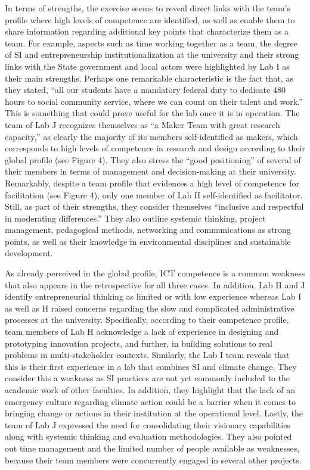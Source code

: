 \documentclass[AMA,STIX1COL,APA,STIX2COL]{WileyNJD-v2}
\begin{document}
In terms of strengths, the exercise seems to reveal direct links with
the team's profile where high levels of competence are identified, as
well as enable them to share information regarding additional key points
that characterize them as a team. For example, aspects such as time
working together as a team, the degree of SI and entrepreneurship
institutionalization at the university and their strong links with the
State government and local actors were highlighted by Lab I as their
main strengths. Perhaps one remarkable characteristic is the fact that,
as they stated, ``all our students have a mandatory federal duty to
dedicate 480 hours to social community service, where we can count on
their talent and work.'' This is something that could prove useful for
the lab once it is in operation. The team of Lab J recognizes themselves
as ``a Maker Team with great research capacity,'' as clearly the
majority of its members self-identified as makers, which corresponds to
high levels of competence in research and design according to their
global profile (see Figure 4). They also stress the ``good positioning''
of several of their members in terms of management and decision-making
at their university. Remarkably, despite a team profile that evidences a
high level of competence for facilitation (see Figure 4), only one
member of Lab H self-identified as facilitator. Still, as part of their
strengths, they consider themselves ``inclusive and respectful in
moderating differences.'' They also outline systemic thinking, project
management, pedagogical methods, networking and communications as strong
points, as well as their knowledge in environmental disciplines and
sustainable development.

As already perceived in the global profile, ICT competence is a common
weakness that also appears in the retrospective for all three cases. In
addition, Lab H and J identify entrepreneurial thinking as limited or
with low experience whereas Lab I as well as H raised concerns regarding
the slow and complicated administrative processes at the university.
Specifically, according to their competence profile, team members of Lab
H acknowledge a lack of experience in designing and prototyping
innovation projects, and further, in building solutions to real problems
in multi-stakeholder contexts. Similarly, the Lab I team reveals that
this is their first experience in a lab that combines SI and climate
change. They consider this a weakness as SI practices are not yet
commonly included to the academic work of other faculties. In addition,
they highlight that the lack of an emergency culture regarding climate
action could be a barrier when it comes to bringing change or actions in
their institution at the operational level. Lastly, the team of Lab J
expressed the need for consolidating their visionary capabilities along
with systemic thinking and evaluation methodologies. They also pointed
out time management and the limited number of people available as
weaknesses, because their team members were concurrently engaged in
several other projects.
\end{document}
